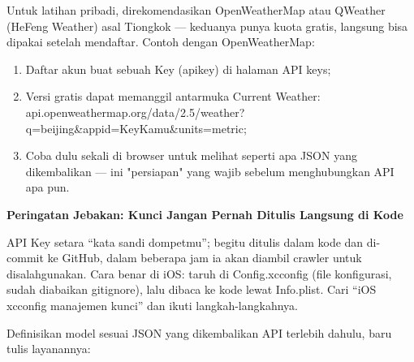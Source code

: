 


Untuk latihan pribadi, direkomendasikan OpenWeatherMap atau QWeather (HeFeng Weather) asal Tiongkok — keduanya punya kuota gratis, langsung bisa dipakai setelah mendaftar. Contoh dengan OpenWeatherMap:

\begin{enumerate}
  \item Daftar akun buat sebuah Key (apikey) di halaman API keys;
  \item Versi gratis dapat memanggil antarmuka Current Weather: api.openweathermap.org/data/2.5/weather? q=beijing\&appid=KeyKamu\&units=metric;
  \item Coba dulu sekali di browser untuk melihat seperti apa JSON yang dikembalikan — ini "persiapan" yang wajib sebelum menghubungkan API apa pun.
\end{enumerate}

\textbf{Peringatan Jebakan: Kunci Jangan Pernah Ditulis Langsung di Kode}\par

API Key setara “kata sandi dompetmu”; begitu ditulis dalam kode dan di-commit ke GitHub, dalam beberapa jam ia akan diambil crawler untuk disalahgunakan. Cara benar di iOS: taruh di Config.xcconfig (file konfigurasi, sudah diabaikan gitignore), lalu dibaca ke kode lewat Info.plist. Cari “iOS xcconfig manajemen kunci” dan ikuti langkah-langkahnya.


Definisikan model sesuai JSON yang dikembalikan API terlebih dahulu, baru tulis layanannya:

